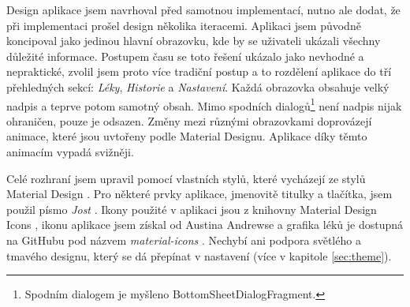 \documentclass[../TakeYourPill.tex]{subfiles}
\begin{document}
Design aplikace jsem navrhoval před samotnou implementací, nutno ale dodat, že při implementaci prošel design několika iteracemi. Aplikaci jsem původně koncipoval jako jedinou hlavní obrazovku, kde by se uživateli ukázali všechny důležité informace. Postupem času se toto řešení ukázalo jako nevhodné a nepraktické, zvolil jsem proto více tradiční postup a to rozdělení aplikace do tří přehledných sekcí: \textit{Léky}, \textit{Historie} a \textit{Nastavení}. Každá obrazovka obsahuje velký nadpis a teprve potom samotný obsah. Mimo spodních dialogů\footnote{Spodním dialogem je myšleno BottomSheetDialogFragment.} není nadpis nijak ohraničen, pouze je odsazen. Změny mezi různými obrazovkami doprovázejí animace, které jsou uvtořeny podle Material Designu. Aplikace díky těmto animacím vypadá svižněji.

Celé rozhraní jsem upravil pomocí vlastních stylů, které vycházejí ze stylů Material Design \cite{materialdesign}. Pro některé prvky aplikace, jmenovitě titulky a tlačítka, jsem použil písmo \textit{Jost} \cite{jost}. Ikony použité v aplikaci jsou z knihovny Material Design Icons \cite{icons}, ikonu aplikace jsem získal od Austina Andrewse \cite{pill-icon} a grafika léků je dostupná na GitHubu pod názvem \textit{material-icons} \cite{pills-icons}. Nechybí ani podpora světlého a tmavého designu, který se dá přepínat v nastavení (více v kapitole \ref{sec:theme}).
\end{document}
